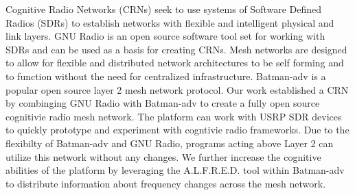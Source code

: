 Cognitive Radio Networks (CRNs) seek to use systems of Software Defined Radios (SDRs) to establish
networks with flexible and intelligent physical and link layers. GNU Radio is an open source software
tool set for working with SDRs and can be used as a basis for creating CRNs.
Mesh networks are designed to allow for flexible and 
distributed network architectures to be self forming and to function without
the need for centralized infrastructure. Batman-adv is a popular open source layer 2 mesh network
protocol. Our work established a CRN by combinging GNU Radio with Batman-adv to create a fully open
source cognitivie radio mesh network. The platform can work with USRP SDR devices to quickly
prototype and experiment with cogntivie radio frameworks. Due to the flexibilty of Batman-adv
and GNU Radio, programs acting above Layer 2 can utilize this network without any changes. We further
increase the cognitive abilities of the platform by leveraging the A.L.F.R.E.D. tool within Batman-adv
to distribute information about frequency changes across the mesh network.  

